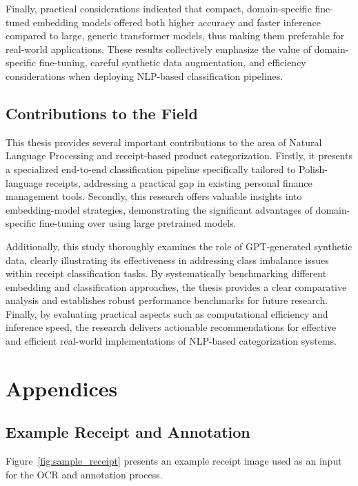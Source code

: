 \documentclass{SGGW-thesis-EN}
\begin{document}
Finally, practical considerations indicated that compact, domain-specific fine-tuned embedding models offered  
both higher accuracy and faster inference compared to large, generic transformer models, thus making them  
preferable for real-world applications. These results collectively emphasize the value of domain-specific  
fine-tuning, careful synthetic data augmentation, and efficiency considerations when deploying NLP-based  
classification pipelines.


\section{Contributions to the Field}

This thesis provides several important contributions to the area of Natural Language Processing and  
receipt-based product categorization. Firstly, it presents a specialized end-to-end classification pipeline  
specifically tailored to Polish-language receipts, addressing a practical gap in existing personal finance  
management tools. Secondly, this research offers valuable insights into embedding-model strategies,  
demonstrating the significant advantages of domain-specific fine-tuning over using large pretrained models.  

Additionally, this study thoroughly examines the role of GPT-generated synthetic data, clearly illustrating  
its effectiveness in addressing class imbalance issues within receipt classification tasks. By systematically  
benchmarking different embedding and classification approaches, the thesis provides a clear comparative analysis  
and establishes robust performance benchmarks for future research. Finally, by evaluating practical aspects such  
as computational efficiency and inference speed, the research delivers actionable recommendations for effective  
and efficient real-world implementations of NLP-based categorization systems.

\chapter{Appendices}

\section{Example Receipt and Annotation}

Figure~\ref{fig:sample_receipt} presents an example receipt image used as an input for the OCR and annotation process.
\end{document}
